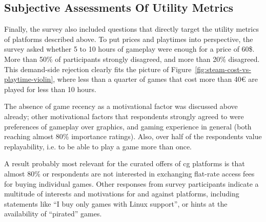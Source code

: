 \subsection{Subjective Assessments Of Utility Metrics}

Finally, the survey also included questions that directly target
the utility metrics of platforms described above.
To put prices and playtimes into perspective, the survey asked
whether 5 to 10 hours of gameplay were enough for a price of 60\$.
More than 50\% of participants strongly disagreed, and more than
20\% disagreed. This demand-side rejection clearly fits the picture of
Figure~\ref{fig:steam-cost-vs-playtime-violin}, where less than a
quarter of games that cost more than 40€ are played for less than
10 hours.

The absence of game recency as a motivational factor was discussed
above already; other motivational factors that respondents strongly
agreed to were preferences of gameplay over graphics, and gaming
experience in general (both reaching almost 80\% importance ratings).
Also, over half of the respondents value replayability, i.e. to
be able to play a game more than once.

A result probably most relevant for the curated offers of \gls{cg}
platforms is that almost 80\% or respondents are not interested in
exchanging flat-rate access fees for buying individual games.
Other responses from survey participants indicate a multitude of
interests and motivations for and against platforms, including
statements like ``I buy only games with Linux support'',
or hints at the availability of ``pirated'' games.
